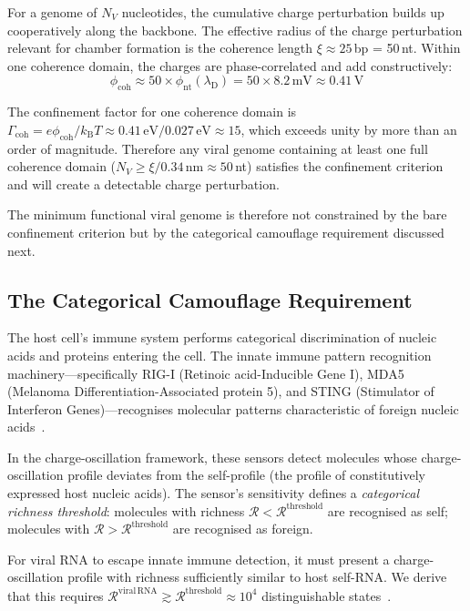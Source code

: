 \documentclass[11pt,twocolumn,a4paper]{article}
\theoremstyle{definition}
\theoremstyle{remark}
\newcommand{\kB}{k_{\mathrm{B}}}
\newcommand{\lD}{\lambda_{\mathrm{D}}}
\newcommand{\Rcat}{\mathcal{R}}
\begin{document}
For a genome of $N_V$ nucleotides, the cumulative charge perturbation builds up cooperatively along the backbone. The effective radius of the charge perturbation relevant for chamber formation is the coherence length $\xi \approx 25$\,bp = 50\,nt. Within one coherence domain, the charges are phase-correlated and add constructively:
\begin{equation}
  \phi_{\mathrm{coh}} \approx 50 \times \phi_{\mathrm{nt}}(\lD) = 50 \times 8.2\,\mathrm{mV} \approx 0.41\,\mathrm{V}
\end{equation}

The confinement factor for one coherence domain is $\Gamma_{\mathrm{coh}} = e\phi_{\mathrm{coh}} / \kB T \approx 0.41\,\mathrm{eV} / 0.027\,\mathrm{eV} \approx 15$, which exceeds unity by more than an order of magnitude. Therefore any viral genome containing at least one full coherence domain ($N_V \geq \xi / 0.34\,\mathrm{nm} \approx 50$\,nt) satisfies the confinement criterion and will create a detectable charge perturbation.

The minimum functional viral genome is therefore not constrained by the bare confinement criterion but by the categorical camouflage requirement discussed next.

\subsection{The Categorical Camouflage Requirement}

The host cell's immune system performs categorical discrimination of nucleic acids and proteins entering the cell. The innate immune pattern recognition machinery---specifically RIG-I (Retinoic acid-Inducible Gene I), MDA5 (Melanoma Differentiation-Associated protein 5), and STING (Stimulator of Interferon Genes)---recognises molecular patterns characteristic of foreign nucleic acids~\cite{Yoneyama2004,Hornung2006,Ishikawa2008}.

In the charge-oscillation framework, these sensors detect molecules whose charge-oscillation profile deviates from the self-profile (the profile of constitutively expressed host nucleic acids). The sensor's sensitivity defines a \emph{categorical richness threshold}: molecules with richness $\Rcat < \Rcat^{\mathrm{threshold}}$ are recognised as self; molecules with $\Rcat > \Rcat^{\mathrm{threshold}}$ are recognised as foreign.

For viral RNA to escape innate immune detection, it must present a charge-oscillation profile with richness sufficiently similar to host self-RNA. We derive that this requires $\Rcat^{\mathrm{viral\,RNA}} \gtrsim \Rcat^{\mathrm{threshold}} \approx 10^4$ distinguishable states~\cite{Pichlmair2006}.
\end{document}
